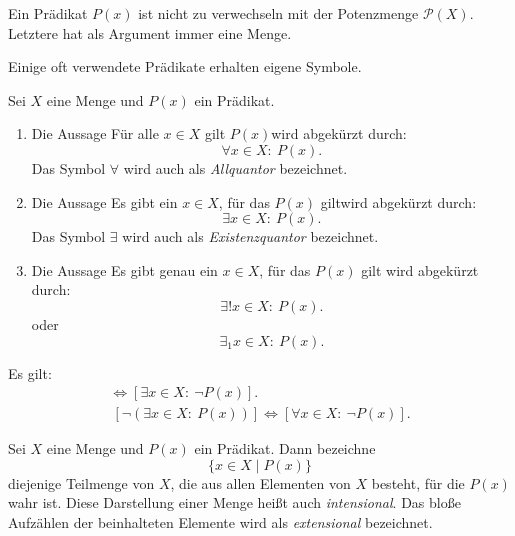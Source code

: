 \begin{frame}
\begin{remark}
Ein Prädikat $P(x)$ ist nicht zu verwechseln mit der Potenzmenge
$\mathcal{P}(X)$.
Letztere hat als Argument immer eine Menge.
\end{remark}

Einige oft verwendete Prädikate erhalten eigene Symbole.
\end{frame}

\begin{frame}
\begin{mydef}
Sei $X$ eine Menge und $P(x)$ ein Prädikat.
\begin{enumerate}
\item Die Aussage \glqq Für alle $x \in X$ gilt $P(x)$\grqq wird abgekürzt
durch:
\[
  \forall x \in X\!:\ P(x).
\]
Das Symbol $\forall$ wird auch als \textit{Allquantor} bezeichnet.

\item Die Aussage \glqq Es gibt ein $x \in X$, für das $P(x)$ gilt\grqq wird
abgekürzt durch:
\[
  \exists x \in X\!:\ P(x).
\]
Das Symbol $\exists$ wird auch als \textit{Existenzquantor} bezeichnet.

\item Die Aussage \glqq Es gibt genau ein $x \in X$, für das $P(x)$ gilt\grqq
wird abgekürzt durch:
\[
  \exists ! x \in X\!:\ P(x).
\]
oder
\[
  \exists_1 x \in X\!:\ P(x).
\]
\end{enumerate}
\end{mydef}
\end{frame}

\begin{frame}
\begin{remark}
Es gilt:
\begin{align*}
  [ \neg (\forall x \in X\!:\ P(x))] \iff [\exists x \in X\!:\ \neg P(x)]. \\\
  [ \neg (\exists x \in X\!:\ P(x))] \iff [\forall x \in X\!:\ \neg P(x)].
\end{align*}
\end{remark}
\end{frame}


\begin{frame}
\begin{mydef}
Sei $X$ eine Menge und $P(x)$ ein Prädikat.
Dann bezeichne
\[
  \{ x \in X \mid P(x) \}
\]
diejenige Teilmenge von $X$, die aus allen Elementen von $X$ besteht,
für die $P(x)$ wahr ist.
Diese Darstellung einer Menge heißt auch \textit{intensional}.
Das bloße Aufzählen der beinhalteten Elemente wird als \textit{extensional}
bezeichnet.
\end{mydef}
\end{frame}

